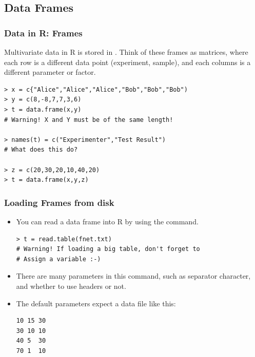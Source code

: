 \documentclass[10pt]{beamer}
\begin{document}
\subsection{Data Frames}

\begin{frame}
  \frametitle{Data in R: Frames}
  \begin{block}{}
    Multivariate data in R is stored in . Think
    of these frames as matrices, where each row is a different data
    point (experiment, sample), and each columns is a different
    parameter or factor.
  \end{block}
\medskip

\begin{verbatim}
> x = c{"Alice","Alice","Alice","Bob","Bob","Bob")
> y = c(8,-8,7,7,3,6)
> t = data.frame(x,y)
# Warning! X and Y must be of the same length!

> names(t) = c("Experimenter","Test Result") 
# What does this do?

> z = c(20,30,20,10,40,20)
> t = data.frame(x,y,z)
\end{verbatim}
\end{frame}

\begin{frame}
  \frametitle{Loading Frames from disk}
  \begin{itemize}
  \item You can read a data frame into R by using the  command. 
\begin{verbatim}
> t = read.table(fnet.txt)
# Warning! If loading a big table, don't forget to
# Assign a variable :-)
\end{verbatim}
\medskip

  \item There are many parameters in this command, such as separator
    character, and whether to use headers or not.
\medskip

  \item The default parameters expect a data file like this:
\begin{verbatim}
10 15 30
30 10 10
40 5  30
70 1  10
\end{verbatim}
  \end{itemize}
\end{frame}
\end{document}
